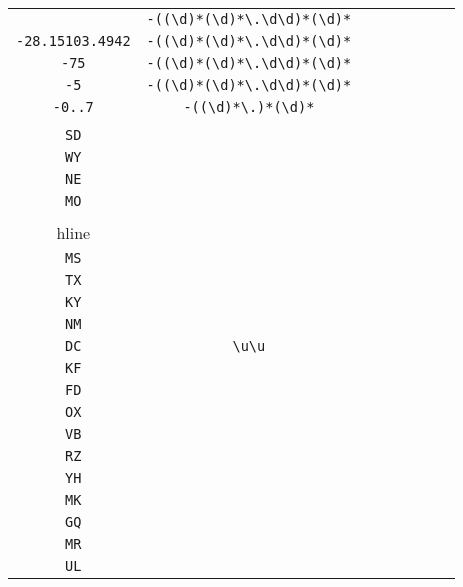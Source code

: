 \begin{longtable}{cccccccc}
\begin{tabular}{ll}
    \verb|-| & \verb|-((\d)*(\d)*\.\d\d)*(\d)*|\\
\verb|-28.15103.4942| & \verb|-((\d)*(\d)*\.\d\d)*(\d)*|\\
\verb|-75| & \verb|-((\d)*(\d)*\.\d\d)*(\d)*|\\
\verb|-5| & \verb|-((\d)*(\d)*\.\d\d)*(\d)*|\\
\verb|-0..7| & \verb|-((\d)*\.)*(\d)*|
\end{tabular}
\\\midrule 
\begin{tabular}{l}
    \verb|MN|\\
\verb|SD|\\
\verb|WY|\\
\verb|NE|\\
\verb|MO|\\
\\hline\\
\verb|MS|\\
\verb|TX|\\
\verb|KY|\\
\verb|NM|\\
\verb|DC|
\end{tabular}

&
\verb|\u\u|
&

\begin{tabular}{l}
    \verb|\u\u|\\
\verb|KF|\\
\verb|FD|\\
\verb|OX|\\
\verb|VB|\\
\verb|RZ|
\end{tabular}

&

\begin{tabular}{l}
    \verb.(M)|(\u)\u.\\
\verb|YH|\\
\verb|MK|\\
\verb|GQ|\\
\verb|MR|\\
\verb|UL|
\end{tabular}

&


\end{longtable}
